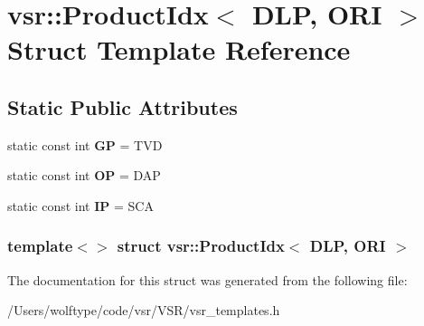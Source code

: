 \hypertarget{structvsr_1_1_product_idx_3_01_d_l_p_00_01_o_r_i_01_4}{\section{vsr\-:\-:Product\-Idx$<$ D\-L\-P, O\-R\-I $>$ Struct Template Reference}
\label{structvsr_1_1_product_idx_3_01_d_l_p_00_01_o_r_i_01_4}
}
\subsection*{Static Public Attributes}
\begin{DoxyCompactItemize}
\item 
\hypertarget{structvsr_1_1_product_idx_3_01_d_l_p_00_01_o_r_i_01_4_a1e887ad224cfe7d5975036b5cd7c8fdf}{static const int {\bfseries G\-P} = T\-V\-D}\label{structvsr_1_1_product_idx_3_01_d_l_p_00_01_o_r_i_01_4_a1e887ad224cfe7d5975036b5cd7c8fdf}

\item 
\hypertarget{structvsr_1_1_product_idx_3_01_d_l_p_00_01_o_r_i_01_4_aaa736e8b008e0beda1ffb36a4ea1f910}{static const int {\bfseries O\-P} = D\-A\-P}\label{structvsr_1_1_product_idx_3_01_d_l_p_00_01_o_r_i_01_4_aaa736e8b008e0beda1ffb36a4ea1f910}

\item 
\hypertarget{structvsr_1_1_product_idx_3_01_d_l_p_00_01_o_r_i_01_4_a84c04d428b4e62d22700ae0cffca2d22}{static const int {\bfseries I\-P} = S\-C\-A}\label{structvsr_1_1_product_idx_3_01_d_l_p_00_01_o_r_i_01_4_a84c04d428b4e62d22700ae0cffca2d22}

\end{DoxyCompactItemize}
\subsubsection*{template$<$$>$ struct vsr\-::\-Product\-Idx$<$ D\-L\-P, O\-R\-I $>$}



The documentation for this struct was generated from the following file\-:\begin{DoxyCompactItemize}
\item 
/\-Users/wolftype/code/vsr/\-V\-S\-R/vsr\-\_\-templates.\-h\end{DoxyCompactItemize}
